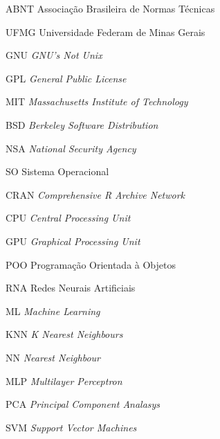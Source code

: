 


\begin{siglas}
	\item[ABNT] Associação Brasileira de Normas Técnicas
	\item[UFMG] Universidade Federam de Minas Gerais
	
	\item[GNU] \textit{GNU's Not Unix}
	\item[GPL] \textit{General Public License }
	\item[MIT] \textit{ Massachusetts Institute of Technology }
	\item[BSD] \textit{Berkeley Software Distribution}
	\item[NSA] \textit{National Security Agency}
	\item[SO] Sistema Operacional
	\item[CRAN] \textit{Comprehensive R Archive Network}
	
	\item[CPU] \textit{Central Processing Unit}
	\item[GPU] \textit{Graphical Processing Unit}
	\item[POO] Programação Orientada à Objetos
	\item[RNA] Redes Neurais Artificiais
	\item[ML] \textit{Machine Learning}
	\item[KNN] \textit{K Nearest Neighbours}
	\item[NN] \textit{Nearest Neighbour}
	\item[MLP]  \textit{Multilayer Perceptron }
	\item[PCA] \textit{Principal Component Analasys}
	\item[SVM]  \textit{Support Vector Machines }
	
	
\end{siglas}



